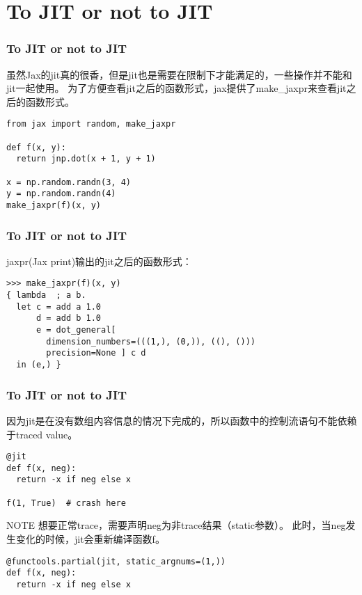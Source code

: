 \documentclass{beamer}
\begin{document}

\section{To JIT or not to JIT}

\begin{frame}[fragile]
\frametitle{To JIT or not to JIT}

虽然Jax的jit真的很香，但是jit也是需要在限制下才能满足的，一些操作并不能和jit一起使用。\newline
为了方便查看jit之后的函数形式，jax提供了make\_jaxpr来查看jit之后的函数形式。
\begin{verbatim}
from jax import random, make_jaxpr

def f(x, y):
  return jnp.dot(x + 1, y + 1)

x = np.random.randn(3, 4)
y = np.random.randn(4)
make_jaxpr(f)(x, y)
\end{verbatim}
\end{frame}

\begin{frame}[fragile]
\frametitle{To JIT or not to JIT}

jaxpr(Jax print)输出的jit之后的函数形式：
\begin{verbatim}
>>> make_jaxpr(f)(x, y)
{ lambda  ; a b.
  let c = add a 1.0
      d = add b 1.0
      e = dot_general[
        dimension_numbers=(((1,), (0,)), ((), ()))
        precision=None ] c d
  in (e,) }
\end{verbatim}
\end{frame}


\begin{frame}[fragile]
\frametitle{To JIT or not to JIT}

因为jit是在没有数组内容信息的情况下完成的，所以函数中的控制流语句不能依赖于traced value。\newline
\begin{verbatim}
@jit
def f(x, neg):
  return -x if neg else x

f(1, True)  # crash here
\end{verbatim}

\begin{block}{NOTE}
想要正常trace，需要声明neg为非trace结果（static参数）。
此时，当neg发生变化的时候，jit会重新编译函数f。
\end{block}

\begin{verbatim}
@functools.partial(jit, static_argnums=(1,))
def f(x, neg):
  return -x if neg else x
\end{verbatim}

\end{frame}
\end{document}

